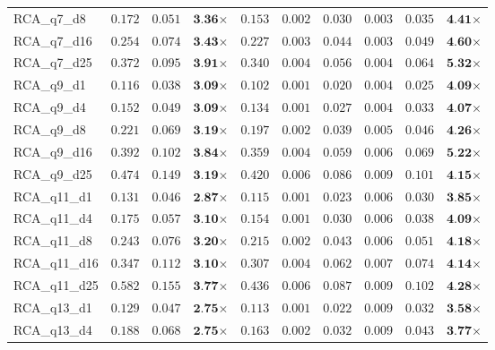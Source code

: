 \begin{table*}[t]
{\begin{tabular}{| l || r r c || r r r r r c |}
RCA\_q7\_d8 & $0.172$ & $0.051$ & $\textbf{3.36}$$\times$ & $0.153$ & $0.002$ & $0.030$ & $0.003$ & $0.035$ & $\textbf{4.41}$$\times$ \\
RCA\_q7\_d16 & $0.254$ & $0.074$ & $\textbf{3.43}$$\times$ & $0.227$ & $0.003$ & $0.044$ & $0.003$ & $0.049$ & $\textbf{4.60}$$\times$ \\
RCA\_q7\_d25 & $0.372$ & $0.095$ & $\textbf{3.91}$$\times$ & $0.340$ & $0.004$ & $0.056$ & $0.004$ & $0.064$ & $\textbf{5.32}$$\times$ \\
RCA\_q9\_d1 & $0.116$ & $0.038$ & $\textbf{3.09}$$\times$ & $0.102$ & $0.001$ & $0.020$ & $0.004$ & $0.025$ & $\textbf{4.09}$$\times$ \\
RCA\_q9\_d4 & $0.152$ & $0.049$ & $\textbf{3.09}$$\times$ & $0.134$ & $0.001$ & $0.027$ & $0.004$ & $0.033$ & $\textbf{4.07}$$\times$ \\
RCA\_q9\_d8 & $0.221$ & $0.069$ & $\textbf{3.19}$$\times$ & $0.197$ & $0.002$ & $0.039$ & $0.005$ & $0.046$ & $\textbf{4.26}$$\times$ \\
RCA\_q9\_d16 & $0.392$ & $0.102$ & $\textbf{3.84}$$\times$ & $0.359$ & $0.004$ & $0.059$ & $0.006$ & $0.069$ & $\textbf{5.22}$$\times$ \\
RCA\_q9\_d25 & $0.474$ & $0.149$ & $\textbf{3.19}$$\times$ & $0.420$ & $0.006$ & $0.086$ & $0.009$ & $0.101$ & $\textbf{4.15}$$\times$ \\
RCA\_q11\_d1 & $0.131$ & $0.046$ & $\textbf{2.87}$$\times$ & $0.115$ & $0.001$ & $0.023$ & $0.006$ & $0.030$ & $\textbf{3.85}$$\times$ \\
RCA\_q11\_d4 & $0.175$ & $0.057$ & $\textbf{3.10}$$\times$ & $0.154$ & $0.001$ & $0.030$ & $0.006$ & $0.038$ & $\textbf{4.09}$$\times$ \\
RCA\_q11\_d8 & $0.243$ & $0.076$ & $\textbf{3.20}$$\times$ & $0.215$ & $0.002$ & $0.043$ & $0.006$ & $0.051$ & $\textbf{4.18}$$\times$ \\
RCA\_q11\_d16 & $0.347$ & $0.112$ & $\textbf{3.10}$$\times$ & $0.307$ & $0.004$ & $0.062$ & $0.007$ & $0.074$ & $\textbf{4.14}$$\times$ \\
RCA\_q11\_d25 & $0.582$ & $0.155$ & $\textbf{3.77}$$\times$ & $0.436$ & $0.006$ & $0.087$ & $0.009$ & $0.102$ & $\textbf{4.28}$$\times$ \\
RCA\_q13\_d1 & $0.129$ & $0.047$ & $\textbf{2.75}$$\times$ & $0.113$ & $0.001$ & $0.022$ & $0.009$ & $0.032$ & $\textbf{3.58}$$\times$ \\
RCA\_q13\_d4 & $0.188$ & $0.068$ & $\textbf{2.75}$$\times$ & $0.163$ & $0.002$ & $0.032$ & $0.009$ & $0.043$ & $\textbf{3.77}$$\times$ \\

\end{tabular}}
\end{table*}
